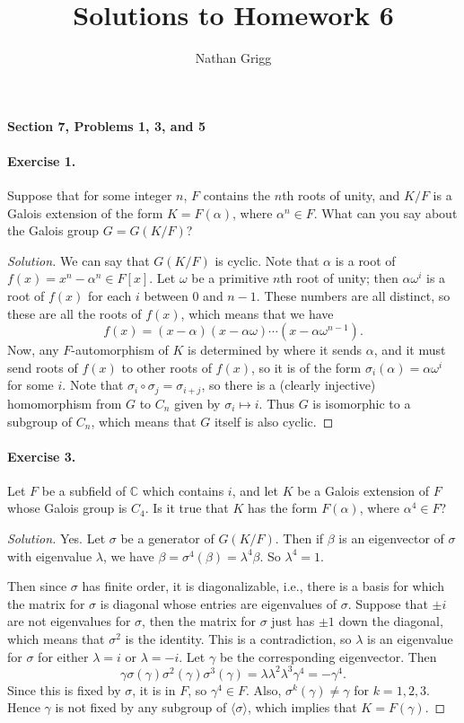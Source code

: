 \documentclass{article}
\title{Solutions to Homework 6}
\author{Nathan Grigg}
\date{}
\newcommand{\C}{\mathbb C}
\begin{document}
\maketitle
{\noindent\bf Section 7, Problems 1, 3, and 5}

\paragraph{Exercise 1.} Suppose that for some integer $n$, $F$ contains the $n$th roots of unity, and $K/F$ is a Galois extension of the form $K=F(\alpha)$, where $\alpha^n\in F$. What can you say about the Galois group $G=G(K/F)$?

\begin{proof}[Solution]
We can say that $G(K/F)$ is cyclic. Note that $\alpha$ is a root of $f(x)=x^n-\alpha^n\in F[x]$. Let $\omega$ be a primitive $n$th root of unity; then $\alpha\omega^i$ is a root of $f(x)$ for each $i$ between 0 and $n-1$. These numbers are all distinct, so these are all the roots of $f(x)$, which means that we have
$$f(x)=(x-\alpha)(x-\alpha\omega)\cdots(x-\alpha\omega^{n-1}).$$
Now, any $F$-automorphism of $K$ is determined by where it sends $\alpha$, and it must send roots of $f(x)$ to other roots of $f(x)$, so it is of the form $\sigma_i(\alpha)=\alpha\omega^i$ for some $i$. Note that $\sigma_i\circ \sigma_j=\sigma_{i+j}$, so there is a (clearly injective) homomorphism from $G$ to $C_n$ given by $\sigma_i\mapsto i$. Thus $G$ is isomorphic to a subgroup of $C_n$, which means that $G$ itself is also cyclic. 
\end{proof}


\paragraph{Exercise 3.} Let $F$ be a subfield of $\C$ which contains $i$, and let $K$ be a Galois extension of $F$ whose Galois group is $C_4$. Is it true that $K$ has the form $F(\alpha)$, where $\alpha^4\in F$?

\begin{proof}[Solution]
Yes. Let $\sigma$ be a generator of $G(K/F)$. Then if $\beta$ is an eigenvector of $\sigma$ with eigenvalue $\lambda$, we have $\beta=\sigma^4(\beta)=\lambda^4\beta$. So $\lambda^4=1$.

Then since $\sigma$ has finite order, it is diagonalizable, i.e., there is a basis for which the matrix for $\sigma$ is diagonal whose entries are eigenvalues of $\sigma$. Suppose that $\pm i$ are not eigenvalues for $\sigma$, then the matrix for $\sigma$ just has $\pm1$ down the diagonal, which means that $\sigma^2$ is the identity. This is a contradiction, so $\lambda$ is an eigenvalue for $\sigma$ for either $\lambda=i$ or $\lambda=-i$. Let $\gamma$ be the corresponding eigenvector. Then
$$\gamma\sigma(\gamma)\sigma^2(\gamma)\sigma^3(\gamma)=\lambda\lambda^2\lambda^3\gamma^4=-\gamma^4.$$
Since this is fixed by $\sigma$, it is in $F$, so $\gamma^4\in F$.
Also, $\sigma^k(\gamma)\neq \gamma$ for $k=1,2,3$. 
Hence $\gamma$ is not fixed by any subgroup of $\langle \sigma
\rangle$, which implies that 
$K=F(\gamma)$.
\end{proof}
\end{document}
